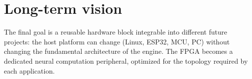 \section{Long-term vision}
The final goal is a reusable hardware block integrable into different future projects:
the host platform can change (Linux, ESP32, MCU, PC) without changing the fundamental
architecture of the engine. The FPGA becomes a dedicated neural computation peripheral,
optimized for the topology required by each application.
